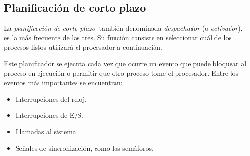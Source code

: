 \subsection{Planificación de corto plazo}

La \textit{planificación de corto plazo}, también denominada \textit{despachador} (o \textit{activador}), es la más frecuente de las tres. Su función consiste en seleccionar cuál de los procesos listos utilizará el procesador a continuación.

Este planificador se ejecuta cada vez que ocurre un evento que puede bloquear al proceso en ejecución o permitir que otro proceso tome el procesador. Entre los eventos más importantes se encuentran:
\begin{itemize}
  \item Interrupciones del reloj.
  \item Interrupciones de E/S.
  \item Llamadas al sistema.
  \item Señales de sincronización, como los semáforos.
\end{itemize}






